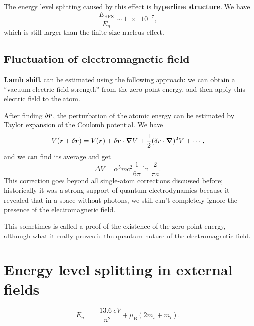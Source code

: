 \documentclass[hyperref, a4paper]{article}
\newcommand*{\concept}[1]{{\textbf{#1}}}
\newcommand{\muB}{\mu_{\text{B}}}
\begin{document}
The energy level splitting caused by this effect 
is \concept{hyperfine structure}.
We have 
\begin{equation}
    \frac{E_{\text{HFS}}}{E_n} \sim \num{1e-7},
\end{equation}
which is still larger than the finite size nucleus effect.

\subsection{Fluctuation of electromagnetic field}

\concept{Lamb shift} can be estimated using the following approach:
we can obtain a ``vacuum electric field strength''
from the zero-point energy, 
and then apply this electric field to the atom.

After finding $\var{\vb*{r}}$, 
the perturbation of the atomic energy can be estimated by 
Taylor expansion of the Coulomb potential.
We have
\begin{equation}
    V(\vb*{r} + \var{\vb*{r}}) = V(\vb*{r}) + 
    \var{\vb*{r}} \cdot \grad{V}
    + \frac{1}{2} (\var{\vb*{r}} \cdot \grad)^2 V + \cdots,
\end{equation}
and we can find its average and get 
\begin{equation}
    \Delta V = \alpha^5 m c^2 \frac{1}{6 \pi} \ln \frac{2}{\pi a}. 
\end{equation}
This correction goes beyond all single-atom corrections discussed before; 
historically it was a strong support of quantum electrodynamics
because it revealed that in a space without photons, 
we still can't completely ignore the presence of the electromagnetic field.

This sometimes is called a proof of the existence of the zero-point energy,
although what it really proves is the quantum nature of the electromagnetic field.

\section{Energy level splitting in external fields}

\begin{equation}
    E_n = \frac{-\SI{13.6}{eV}}{n^2} + \muB (2m_s + m_l).
\end{equation}
\end{document}
